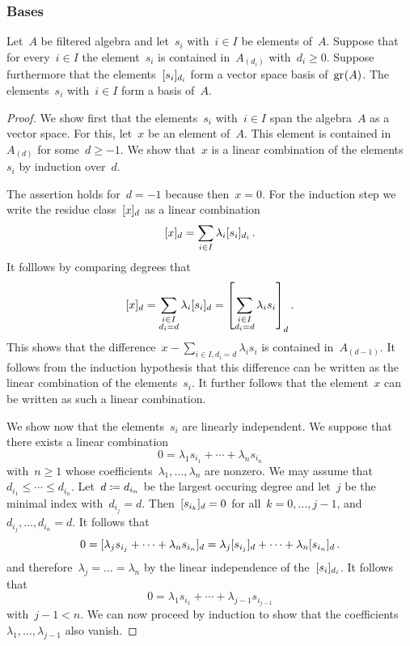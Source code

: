 \subsubsection{Bases}

\begin{proposition}
	\label{checking basis via associated graded}
	Let~$A$ be filtered algebra and let~$s_i$ with~$i \in I$ be elements of~$A$.
	Suppose that for every~$i \in I$ the element~$s_i$ is contained in~$A_{(d_i)}$ with~$d_i \geq 0$.
	Suppose furthermore that the elements~$\lbrack s_i \rbrack_{d_i}$ form a vector space basis of~$\gr(A)$.
	The elements~$s_i$ with~$i \in I$ form a basis of~$A$.
\end{proposition}


\begin{proof}
	We show first that the elements~$s_i$ with~$i \in I$ span the algebra~$A$ as a vector space.
	For this, let~$x$ be an element of~$A$.
	This element is contained in~$A_{(d)}$ for some~$d \geq -1$.
	We show that~$x$ is a linear combination of the elements~$s_i$ by induction over~$d$.

	The assertion holds for~$d = -1$ because then~$x = 0$.
	For the induction step we write the residue class~$\lbrack x \rbrack_d$ as a linear combination
	\[
		\lbrack x \rbrack_d
		=
		\sum_{i \in I}
		\lambda_i \lbrack s_i \rbrack_{d_i} \,.
	\]
	It folllows by comparing degrees that
	\[
		\fclass{ x }_d
		=
		\sum_{\substack{ i \in I \\ d_i = d}}
		\lambda_i \fclass{ s_i }_d
		=
		\fclass*{
			\sum_{\substack{i \in I \\ d_i = d}}
			\lambda_i s_i
		}_d \,.
	\]
	This shows that the difference~$x - \sum_{i \in I, d_i = d} \lambda_i s_i$ is contained in~$A_{(d-1)}$.
	It follows from the induction hypothesis that this difference can be written as the linear combination of the elements~$s_i$.
	It further follows that the element~$x$ can be written as such a linear combination.

	We show now that the elements~$s_i$ are linearly independent.
	We suppose that there exists a linear combination
	\[
		0
		=
		\lambda_1 s_{i_1} + \dotsb + \lambda_n s_{i_n}
	\]
	with~$n \geq 1$ whose coefficients~$\lambda_1, \dotsc, \lambda_n$ are nonzero.
	We may assume that~$d_{i_1} \leq \dotsb \leq d_{i_n}$.
	Let~$d \coloneqq d_{i_n}$ be the largest occuring degree and let~$j$ be the minimal index with~$d_{i_j} = d$.
	Then~$\lbrack s_{i_k} \rbrack_d = 0$ for all~$k = 0, \dotsc, j-1$, and~$d_{i_j}, \dotsc, d_{i_n} = d$.
	It follows that
	\[
		0
		=
		\lbrack \lambda_j s_{i_j} + \dotsb + \lambda_n s_{i_n} \rbrack_d
		=
		\lambda_j \lbrack s_{i_j} \rbrack_d + \dotsb + \lambda_n \lbrack s_{i_n} \rbrack_d \,.
	\]
	and therefore~$\lambda_j = \dotsc = \lambda_n$ by the linear independence of the~$\lbrack s_i\rbrack_{d_i}$.
	It follows that
	\[
		0
		=
		\lambda_1 s_{i_1} + \dotsb + \lambda_{j-1} s_{i_{j-1}}
	\]
	with~$j-1 < n$.
	We can now proceed by induction to show that the coefficients~$\lambda_1, \dotsc, \lambda_{j-1}$ also vanish.
\end{proof}





